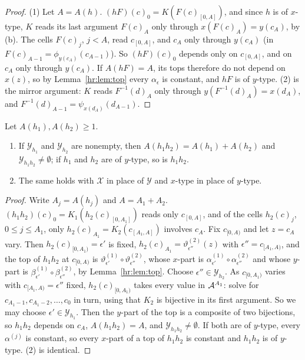 \begin{proof}
(1) Let $A=A(h)$. $(hF)(c)_0=K(F(c)_{[0,A]})$, and since $h$ is of $x$-type, $K$ reads its last argument $F(c)_A$ only through $x(F(c)_A)=y(c_A)$, by (b). The cells $F(c)_j$, $j<A$, read $c_{[0,A]}$, and $c_A$ only through $y(c_A)$ (in $F(c)_{A-1}=\phi_{y(c_A)}(c_{A-1})$). So $(hF)(c)_0$ depends only on $c_{[0,A]}$, and on $c_A$ only through $y(c_A)$. If $A(hF)=A$, its tops therefore do not depend on $x(z)$, so by Lemma~\ref{hr:lem:top} every $\alpha_\epsilon$ is constant, and $hF$ is of $y$-type. (2) is the mirror argument: $K$ reads $F^{-1}(d)_A$ only through $y(F^{-1}(d)_A)=x(d_A)$, and $F^{-1}(d)_{A-1}=\psi_{x(d_A)}(d_{A-1})$.
\end{proof}

\begin{lemma}\label{hr:lem:comp}
Let $A(h_1),A(h_2)\ge1$.
\begin{enumerate}
\item If $\mathcal Y_{h_1}$ and $\mathcal Y_{h_2}$ are nonempty, then $A(h_1h_2)=A(h_1)+A(h_2)$ and $\mathcal Y_{h_1h_2}\ne\emptyset$; if $h_1$ and $h_2$ are of $y$-type, so is $h_1h_2$.
\item The same holds with $\mathcal X$ in place of $\mathcal Y$ and $x$-type in place of $y$-type.
\end{enumerate}
\end{lemma}

\begin{proof}
Write $A_j=A(h_j)$ and $A=A_1+A_2$. $(h_1h_2)(c)_0=K_1(h_2(c)_{[0,A_1]})$ reads only $c_{[0,A]}$, and of the cells $h_2(c)_j$, $0\le j\le A_1$, only $h_2(c)_{A_1}=K_2(c_{[A_1,A]})$ involves $c_A$. Fix $c_{[0,A)}$ and let $z=c_A$ vary. Then $h_2(c)_{[0,A_1)}=\epsilon'$ is fixed, $h_2(c)_{A_1}=\vartheta^{(2)}_{\epsilon''}(z)$ with $\epsilon''=c_{[A_1,A)}$, and the top of $h_1h_2$ at $c_{[0,A)}$ is $\vartheta^{(1)}_{\epsilon'}\circ\vartheta^{(2)}_{\epsilon''}$, whose $x$-part is $\alpha^{(1)}_{\epsilon'}\circ\alpha^{(2)}_{\epsilon''}$ and whose $y$-part is $\beta^{(1)}_{\epsilon'}\circ\beta^{(2)}_{\epsilon''}$, by Lemma~\ref{hr:lem:top}. Choose $\epsilon''\in\mathcal Y_{h_2}$. As $c_{[0,A_1)}$ varies with $c_{[A_1,A)}=\epsilon''$ fixed, $h_2(c)_{[0,A_1)}$ takes every value in $\mathcal{A}^{A_1}$: solve for $c_{A_1-1},c_{A_1-2},\dots,c_0$ in turn, using that $K_2$ is bijective in its first argument. So we may choose $\epsilon'\in\mathcal Y_{h_1}$. Then the $y$-part of the top is a composite of two bijections, so $h_1h_2$ depends on $c_A$, $A(h_1h_2)=A$, and $\mathcal Y_{h_1h_2}\ne\emptyset$. If both are of $y$-type, every $\alpha^{(j)}$ is constant, so every $x$-part of a top of $h_1h_2$ is constant and $h_1h_2$ is of $y$-type. (2) is identical.
\end{proof}

